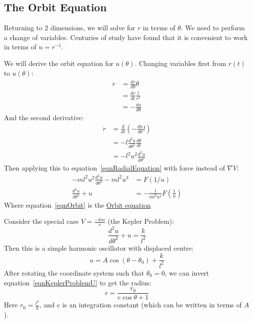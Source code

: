 \documentclass[../Main.tex]{subfiles}
\begin{document}
\subsection{The Orbit Equation}
Returning to 2 dimensions, we will solve for $r$ in terms of $\theta$. We need to perform a change of variables. Centuries of study have found that it is convenient to work in terms of $u = r^{-1}$.\par
We will derive the orbit equation for $u(\theta)$. Changing variables first from $r(t)$ to $u(\theta)$:
\begin{align*}
    \dot{r} &= \frac{dr}{d\theta} \dot{\theta} \\
    &= \frac{dr}{dt}\frac{l}{r^2}\\
    &= -\frac{du}{d\theta}
\end{align*}
And the second derivative:
\begin{align*}
    \ddot{r} &= \frac{d}{dt}\left(-\frac{du}{d\theta}l\right) \\
    &= -l\frac{d^2u}{d\theta^2}\frac{d\theta}{dt} \\
    &= -l^2 u^2 \frac{d^2u}{d\theta^2}
\end{align*}
Then applying this to equation~\ref{eqnRadialEquation} with force instead of $\nabla V$:
\begin{align}
    -ml^2 u^2 \frac{d^2u}{d\theta^2} - ml^2 u^3 &= F\left(1/u\right) \nonumber \\
    \frac{d^2u}{d\theta^2} + u &= -\frac{1}{ml^2u^2} F\left(\frac{1}{u}\right) \label{eqnOrbit}
\end{align}
Where equation~\ref{eqnOrbit} is the \underline{Orbit equation}\par
Consider the special case $V = \frac{-km}{r}$ (the Kepler Problem):
\begin{equation*}
    \frac{d^2u}{d\theta^2} + u = \frac{k}{l^2}
\end{equation*}
Then this is a simple harmonic oscillator with displaced centre:
\begin{equation}
    u = A \cos{(\theta - \theta_0)} + \frac{k}{l^2}
    \label{eqnKeplerProblemU}
\end{equation}
After rotating the coordinate system such that $\theta_0 = 0$, we can invert equation~\ref{eqnKeplerProblemU} to get the radius:
\begin{equation}
    r = \frac{r_0}{e\cos{\theta} + 1}
    \label{eqnKeplerProblemR}
\end{equation}
Here $r_0 = \frac{l^2}{k}$, and $e$ is an integration constant (which can be written in terms of $A$).\par
\end{document}
